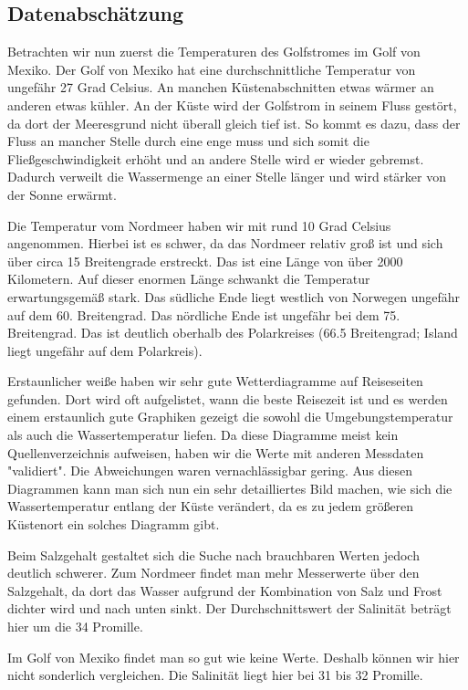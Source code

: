\documentclass[a4paper,twoside]{article}
\begin{document}
	\subsection{Datenabschätzung}
	\noindent Betrachten wir nun zuerst die Temperaturen des Golfstromes im Golf von Mexiko. Der Golf von Mexiko hat eine durchschnittliche Temperatur von ungefähr 27 Grad Celsius. An manchen Küstenabschnitten etwas wärmer an anderen etwas kühler. An der Küste wird der Golfstrom in seinem Fluss gestört, da dort der Meeresgrund nicht überall gleich tief ist. So kommt es dazu, dass der Fluss an mancher Stelle durch eine enge muss und sich somit die Fließgeschwindigkeit erhöht und an andere Stelle wird er wieder gebremst. Dadurch verweilt die Wassermenge an einer Stelle länger und wird stärker von der Sonne erwärmt. 
	
	Die Temperatur vom Nordmeer haben wir mit rund 10 Grad Celsius angenommen. Hierbei ist es schwer, da das Nordmeer relativ groß ist und sich über circa 15 Breitengrade erstreckt. Das ist eine Länge von über 2000 Kilometern. Auf dieser enormen Länge schwankt die Temperatur erwartungsgemäß stark. Das südliche Ende liegt westlich von Norwegen ungefähr auf dem 60. Breitengrad. Das nördliche Ende ist ungefähr bei dem 75. Breitengrad. Das ist deutlich oberhalb des Polarkreises (66.5 Breitengrad; Island liegt ungefähr auf dem Polarkreis).

	Erstaunlicher weiße haben wir sehr gute Wetterdiagramme auf Reiseseiten gefunden. Dort wird oft aufgelistet, wann die beste Reisezeit ist und es werden einem erstaunlich gute Graphiken gezeigt die sowohl die Umgebungstemperatur als auch die Wassertemperatur liefen. Da diese Diagramme meist kein Quellenverzeichnis aufweisen, haben wir die Werte mit anderen Messdaten "validiert". Die Abweichungen waren vernachlässigbar gering. Aus diesen Diagrammen kann man sich nun ein sehr detailliertes Bild machen, wie sich die Wassertemperatur entlang der Küste verändert, da es zu jedem größeren Küstenort ein solches Diagramm gibt.

	Beim Salzgehalt gestaltet sich die Suche nach brauchbaren Werten jedoch deutlich schwerer. Zum Nordmeer findet man mehr Messerwerte über den Salzgehalt, da dort das Wasser aufgrund der Kombination von Salz und Frost dichter wird und nach unten sinkt. Der Durchschnittswert der Salinität beträgt hier um die 34 Promille. 

	Im Golf von Mexiko findet man so gut wie keine Werte. Deshalb können wir hier nicht sonderlich vergleichen. Die Salinität liegt hier bei 31 bis 32 Promille.
\end{document}
